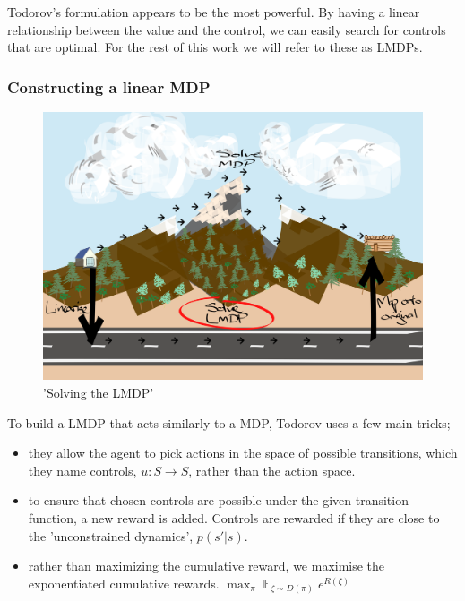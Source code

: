 Todorov's formulation appears to be the most powerful. By having a linear
relationship between the value and the control, we can easily search for controls that
are optimal. For the rest of this work we will refer to these as LMDPs.

\subsubsection{Constructing a linear MDP}

\begin{figure}
  \centering
  \includegraphics[width=1\textwidth,height=0.5\textheight]{../../pictures/drawings/abstract-representations-solve.png}
  \caption{'Solving the LMDP'}
\end{figure}

To build a LMDP that acts similarly to a MDP, Todorov \cite{Todorov2006} uses a few main {\color{red}tricks};

\begin{itemize}
\tightlist
  \item
  they allow the agent to pick actions in the space of possible transitions, which they name controls, $u: S \to S$, rather than the action space.
  \item
  to ensure that chosen controls are possible under the given transition function, a new reward is added.
  Controls are rewarded if they are close to the 'unconstrained dynamics', $p(s' | s)$.
  \item
  rather than maximizing the cumulative reward, we maximise the exponentiated cumulative rewards.
  $\mathop{\text{max}}_{\pi} \mathop{\mathbb E}_{\zeta \sim D(\pi)} e^{R(\zeta)}$ \cite{EricWarrenFox2016}
\end{itemize}

